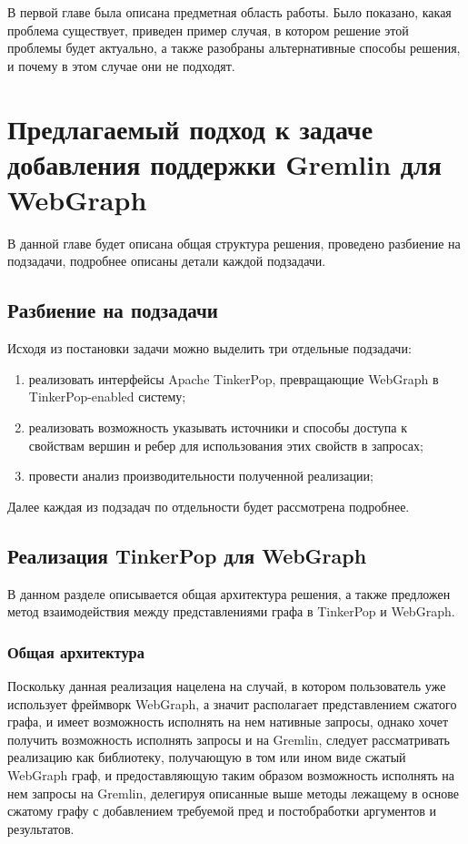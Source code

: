\documentclass[times,specification,annotation]{itmo-student-thesis}
\begin{document}
\finishrelatedwork

\chapterconclusion
В первой главе была описана предметная область работы. Было показано, какая проблема существует, приведен пример случая, в котором решение этой проблемы будет актуально, а также разобраны альтернативные способы решения, и почему в этом случае они не подходят.

\chapter{Предлагаемый подход к задаче добавления поддержки Gremlin для WebGraph}

В данной главе будет описана общая структура решения, проведено разбиение на подзадачи, подробнее описаны детали каждой подзадачи. 

\section{Разбиение на подзадачи}

Исходя из постановки задачи можно выделить три отдельные подзадачи:

\begin{enumerate}
    \item реализовать интерфейсы Apache TinkerPop, превращающие WebGraph в TinkerPop-enabled систему;
    \item реализовать возможность указывать источники и способы доступа к свойствам вершин и ребер для использования этих свойств в запросах;
    \item провести анализ производительности полученной реализации;
\end{enumerate}

Далее каждая из подзадач по отдельности будет рассмотрена подробнее.

\section{Реализация TinkerPop для WebGraph}

В данном разделе описывается общая архитектура решения, а также предложен метод взаимодействия между представлениями графа в TinkerPop и WebGraph.

\subsection{Общая архитектура}

Поскольку данная реализация нацелена на случай, в котором пользователь уже использует фреймворк WebGraph, а значит располагает представлением сжатого графа, и имеет возможность исполнять на нем нативные запросы, однако хочет получить возможность исполнять запросы и на Gremlin, следует рассматривать реализацию как библиотеку, получающую в том или ином виде сжатый WebGraph граф, и предоставляющую таким образом возможность исполнять на нем запросы на Gremlin, делегируя описанные выше методы лежащему в основе сжатому графу с добавлением требуемой пред и постобработки аргументов и результатов.
\end{document}
